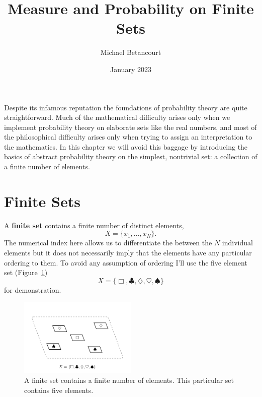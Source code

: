 \documentclass[
  letterpaper,
  DIV=11,
  numbers=noendperiod]{scrartcl}
\title{Measure and Probability on Finite Sets}
\author{Michael Betancourt}
\date{January 2023}
\renewcommand*\contentsname{Table of contents}
\newcommand\contentsname{Table of contents}
\begin{document}
\maketitle
\ifdefined\Shaded\renewenvironment{Shaded}{\begin{tcolorbox}[boxrule=0pt, sharp corners, interior hidden, frame hidden, enhanced, breakable, borderline west={3pt}{0pt}{shadecolor}]}{\end{tcolorbox}}\fi

\renewcommand*\contentsname{Table of contents}
{
\hypersetup{linkcolor=}
\setcounter{tocdepth}{3}
\tableofcontents
}
Despite its infamous reputation the foundations of probability theory
are quite straightforward. Much of the mathematical difficulty arises
only when we implement probability theory on elaborate sets like the
real numbers, and most of the philosophical difficulty arises only when
trying to assign an interpretation to the mathematics. In this chapter
we will avoid this baggage by introducing the basics of abstract
probability theory on the simplest, nontrivial set: a collection of a
finite number of elements.

\hypertarget{finite-sets}{%
\section{Finite Sets}\label{finite-sets}}

A \textbf{finite set} contains a finite number of distinct elements, \[
X = \{x_1, ..., x_N\}.
\] The numerical index here allows us to differentiate the between the
\(N\) individual elements but it does not necessarily imply that the
elements have any particular ordering to them. To avoid any assumption
of ordering I'll use the five element set (Figure~\ref{fig-ambient_set})
\[
X = \{\Box, \clubsuit, \diamondsuit, \heartsuit, \spadesuit\}
\] for demonstration.

\begin{figure}

{\centering \includegraphics[width=0.5\textwidth,height=\textheight]{figures/ambient_set/ambient_set.pdf}

}

\caption{\label{fig-ambient_set}A finite set contains a finite number of
elements. This particular set contains five elements.}

\end{figure}
\end{document}
